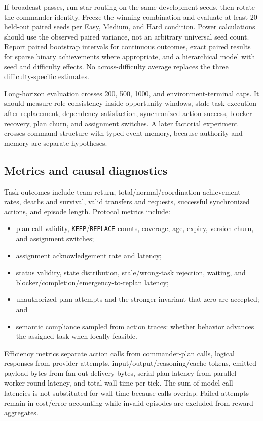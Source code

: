 \documentclass[11pt]{article}
\newcommand{\code}[1]{\texttt{#1}}
\begin{document}
If broadcast passes, run star routing on the same development seeds, then rotate
the commander identity.  Freeze the winning combination and evaluate at least 20
held-out paired seeds per Easy, Medium, and Hard condition.  Power calculations
should use the observed paired variance, not an arbitrary universal seed count.
Report paired bootstrap intervals for continuous outcomes, exact paired results
for sparse binary achievements where appropriate, and a hierarchical model with
seed and difficulty effects.  No across-difficulty average replaces the three
difficulty-specific estimates.

Long-horizon evaluation crosses 200, 500, 1000, and environment-terminal caps.
It should measure role consistency inside opportunity windows, stale-task
execution after replacement, dependency satisfaction, synchronized-action
success, blocker recovery, plan churn, and assignment switches.  A later
factorial experiment crosses command structure with typed event memory, because
authority and memory are separate hypotheses.

\subsection{Metrics and causal diagnostics}

Task outcomes include team return, total/normal/coordination achievement rates,
deaths and survival, valid transfers and requests, successful synchronized
actions, and episode length.  Protocol metrics include:
\begin{itemize}
  \item plan-call validity, \code{KEEP}/\code{REPLACE} counts, coverage, age,
  expiry, version churn, and assignment switches;
  \item assignment acknowledgement rate and latency;
  \item status validity, state distribution, stale/wrong-task rejection, waiting,
  and blocker/completion/emergency-to-replan latency;
  \item unauthorized plan attempts and the stronger invariant that zero are
  accepted; and
  \item semantic compliance sampled from action traces: whether behavior advances
  the assigned task when locally feasible.
\end{itemize}

Efficiency metrics separate action calls from commander-plan calls, logical
responses from provider attempts, input/output/reasoning/cache tokens, emitted
payload bytes from fan-out delivery bytes, serial plan latency from parallel
worker-round latency, and total wall time per tick.  The sum of model-call
latencies is not substituted for wall time because calls overlap.  Failed
attempts remain in cost/error accounting while invalid episodes are excluded
from reward aggregates.
\end{document}
